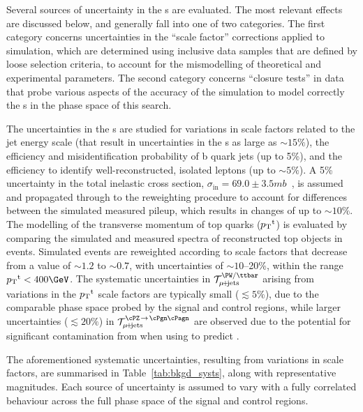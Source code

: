 Several sources of uncertainty in the {\tf}s are evaluated.  The most
relevant effects are discussed below, and generally fall into one of
two categories. The first category concerns uncertainties in the
``scale factor'' corrections applied to simulation, which are
determined using inclusive data samples that are defined by loose
selection criteria, to account for the mismodelling of theoretical and
experimental parameters. The second category concerns ``closure
tests'' in data that probe various aspects of the accuracy of the
simulation to model correctly the {\tf}s in the phase space of this
search.

The uncertainties in the {\tf}s are studied for variations in scale
factors related to the jet energy scale (that result in uncertainties
in the {\tf}s as large as $\sim 15\%$), the efficiency and
misidentification probability of b quark jets (up to 5\%), and the
efficiency to identify well-reconstructed, isolated leptons (up to
$\sim 5\%$). A 5\% uncertainty in the total inelastic cross section,
$\sigma_\text{in} = 69.0 \pm 3.5\unit{mb}$~\cite{Aaboud:2016mmw}, is
assumed and propagated through to the reweighting procedure to account
for differences between the simulated measured pileup, which results
in changes of up to $\sim 10\%$. The modelling of the transverse
momentum of top quarks (${p_{\text T}}^\text{t}$) is evaluated by comparing the
simulated and measured \Pt spectra of reconstructed top objects in
\ttbar events.
Simulated events are reweighted according to scale factors that
decrease from a value of $\sim 1.2$ to $\sim 0.7$, with uncertainties of
$\sim 10$--20\%, within the range $\Pt^\text{t} < 400\GeV$.
The systematic uncertainties in $\tf^\text{\PW/\ttbar}_{\mj}$ arising
from variations in the ${p_{\text T}}^\text{t}$ scale factors are typically
small ($\lesssim 5\%$), due to the comparable phase space probed by the
signal and control regions, while larger uncertainties
($\lesssim 20\%$) in $\tf^{\text{\znunu}}_{\mj}$ are observed due to
the potential for significant contamination from \ttbar when using
\wlj to predict \znunuj.

The aforementioned systematic uncertainties, resulting from variations
in scale factors, are summarised in Table~\ref{tab:bkgd_systs}, along
with representative magnitudes.  Each source of uncertainty is assumed
to vary with a fully correlated behaviour across the full phase space
of the signal and control regions.


